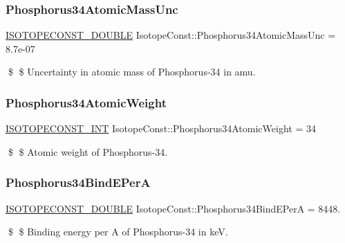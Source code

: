 \subsubsection{\texorpdfstring{Phosphorus34\+Atomic\+Mass\+Unc}{Phosphorus34AtomicMassUnc}}
{\footnotesize\ttfamily \mbox{\hyperlink{group___isotope_const-_macros_ga8f45a7272ce02c0b4c65c44636ed719a}{I\+S\+O\+T\+O\+P\+E\+C\+O\+N\+S\+T\+\_\+\+D\+O\+U\+B\+LE}} Isotope\+Const\+::\+Phosphorus34\+Atomic\+Mass\+Unc = 8.\+7e-\/07}

\$ \$ Uncertainty in atomic mass of Phosphorus-\/34 in amu. \mbox{\label{group___isotope_const-_phosphorus-_p34_ga9aa5b4d9eea6b4595d19327b65c9c613}} 
\subsubsection{\texorpdfstring{Phosphorus34\+Atomic\+Weight}{Phosphorus34AtomicWeight}}
{\footnotesize\ttfamily \mbox{\hyperlink{group___isotope_const-_macros_ga5f18360b3e99483a35c32d789e62621c}{I\+S\+O\+T\+O\+P\+E\+C\+O\+N\+S\+T\+\_\+\+I\+NT}} Isotope\+Const\+::\+Phosphorus34\+Atomic\+Weight = 34}

\$ \$ Atomic weight of Phosphorus-\/34. \mbox{\label{group___isotope_const-_phosphorus-_p34_gacf46a441e0bc12c35db611f9c671d61d}} 
\subsubsection{\texorpdfstring{Phosphorus34\+Bind\+E\+PerA}{Phosphorus34BindEPerA}}
{\footnotesize\ttfamily \mbox{\hyperlink{group___isotope_const-_macros_ga8f45a7272ce02c0b4c65c44636ed719a}{I\+S\+O\+T\+O\+P\+E\+C\+O\+N\+S\+T\+\_\+\+D\+O\+U\+B\+LE}} Isotope\+Const\+::\+Phosphorus34\+Bind\+E\+PerA = 8448.}

\$ \$ Binding energy per A of Phosphorus-\/34 in keV. \mbox{\label{group___isotope_const-_phosphorus-_p34_gaf883d4ffb6a02b1ffe6dd7ba01fb5412}} 
